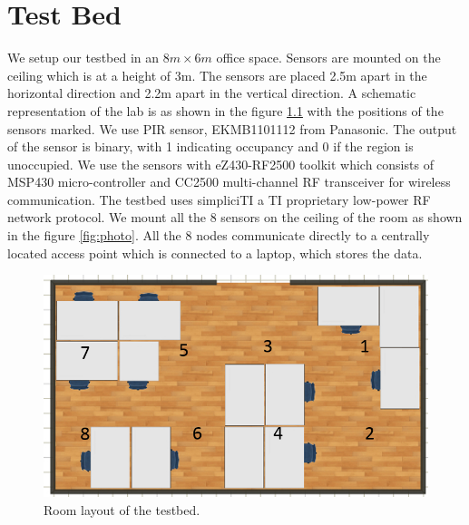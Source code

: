 \chapter{Test Bed}
\label{chp:testbed}
We setup our testbed in an $8m\times6m$ office space. Sensors are mounted on the ceiling which is at a height of 3m. The sensors are  placed 2.5m apart in the horizontal direction and 2.2m apart in the vertical direction. A schematic representation of the lab is as shown in the figure \ref{fig:roomLayout} with the positions of the sensors marked. We use  PIR sensor, EKMB1101112 from Panasonic. 
The output of the sensor is binary, with 1 indicating occupancy and 0 if the region is unoccupied.  We use the sensors with eZ430-RF2500 toolkit which consists of MSP430 micro-controller  and CC2500 multi-channel
RF transceiver for wireless communication. The testbed uses simpliciTI a TI proprietary  low-power RF network protocol.  We mount all the 8 sensors on the ceiling of the room as shown in the figure \ref{fig:photo}. 
All the 8 nodes communicate directly to a centrally located access point which is connected to a laptop, which stores the data.

\begin{figure}[!ht]
\centering
\includegraphics[scale=0.5]{./pics/roomLayout.png}
\caption{Room layout of the testbed.}
\label{fig:roomLayout}
\end{figure}


